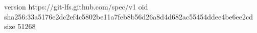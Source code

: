 version https://git-lfs.github.com/spec/v1
oid sha256:33a5176e2dc2ef4c5802be11a7feb8b56d26a8d4d682ac55454ddee4be6ee2cd
size 51268
